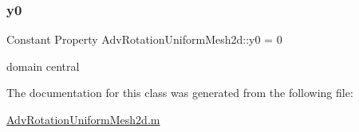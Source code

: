 \subsubsection{\texorpdfstring{y0}{y0}}
{\footnotesize\ttfamily Constant Property Adv\+Rotation\+Uniform\+Mesh2d\+::y0 = 0}



domain central 



The documentation for this class was generated from the following file\+:\begin{DoxyCompactItemize}
\item 
\hyperlink{_adv_rotation_uniform_mesh2d_8m}{Adv\+Rotation\+Uniform\+Mesh2d.\+m}\end{DoxyCompactItemize}
